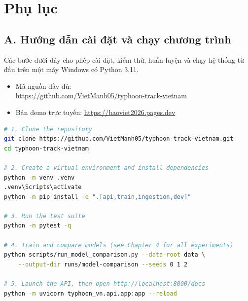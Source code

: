\chapter{Phụ lục}
\setcounter{lstlisting}{0}
\renewcommand{\thelstlisting}{A.\arabic{lstlisting}}

\section*{A. Hướng dẫn cài đặt và chạy chương trình}
{}

Các bước dưới đây cho phép cài đặt, kiểm thử, huấn luyện và chạy hệ thống
từ đầu trên một máy Windows có Python 3.11.

\begin{itemize}[leftmargin=1.6em, itemsep=2pt]
  \item Mã nguồn đầy đủ:\\ \url{https://github.com/VietManh05/typhoon-track-vietnam}
  \item Bản demo trực tuyến: \url{https://baoviet2026.pages.dev}
\end{itemize}

\begin{lstlisting}[language=bash, caption={Các bước cài đặt, huấn luyện và khởi chạy hệ thống.}]
# 1. Clone the repository
git clone https://github.com/VietManh05/typhoon-track-vietnam.git
cd typhoon-track-vietnam

# 2. Create a virtual environment and install dependencies
python -m venv .venv
.venv\Scripts\activate
python -m pip install -e ".[api,train,ingestion,dev]"

# 3. Run the test suite
python -m pytest -q

# 4. Train and compare models (see Chapter 4 for all experiments)
python scripts/run_model_comparison.py --data-root data \
    --output-dir runs/model-comparison --seeds 0 1 2

# 5. Launch the API, then open http://localhost:8000/docs
python -m uvicorn typhoon_vn.api.app:app --reload
\end{lstlisting}

